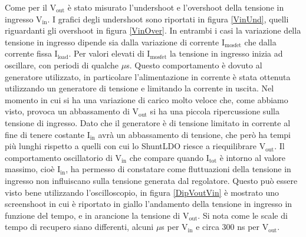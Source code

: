 Come per il $\mathrm{V_{out}}$ è stato misurato l'undershoot e l'overshoot della tensione in ingresso $\mathrm{V_{in}}$. I grafici degli undershoot sono riportati in figura \ref{VinUnd}, quelli riguardanti gli overshoot in figura \ref{VinOver}. 
In entrambi i casi la variazione della tensione in ingresso dipende sia dalla variazione di corrente $\mathrm{I_{mosfet}}$ che dalla corrente fissa $\mathrm{I_{load}}$. 
Per valori elevati di $\mathrm{I_{mosfet}}$ la tensione in ingresso inizia ad oscillare, con periodi di qualche $\mu$s. Questo comportamento è dovuto al generatore utilizzato, in particolare l'alimentazione in corrente è stata ottenuta utilizzando un generatore di tensione e limitando la corrente in uscita. 
Nel momento in cui si ha una variazione di carico molto veloce che, come abbiamo visto, provoca un abbassamento di $\mathrm{V_{out}}$ si ha una piccola ripercussione sulla tensione di ingresso. 
Dato che il generatore è di tensione limitato in corrente al fine di tenere costante $\mathrm{I_{in}}$ avrà un abbassamento di tensione, che però ha tempi più lunghi rispetto a quelli con cui lo ShuntLDO riesce a riequilibrare $\mathrm{V_{out}}$. Il comportamento oscillatorio di $\mathrm{V_{in}}$ che compare quando $\mathrm{I_{tot}}$ è  intorno al valore massimo, cioè $\mathrm{I_{in}}$, ha permesso di constatare come fluttuazioni della tensione in ingresso non influiscano sulla tensione generata dal regolatore. Questo può essere visto bene utilizzando l'oscilloscopio, in figura \ref{DipVoutVin} è mostrato uno screenshoot in cui è riportato in giallo l'andamento della tensione in ingresso in funzione del tempo, e in arancione la tensione di $\mathrm{V_{out}}$. Si nota come le scale di tempo di recupero siano differenti, alcuni $\mu$s per $\mathrm{V_{in}}$ e circa 300 ns per $\mathrm{V_{out}}$.

